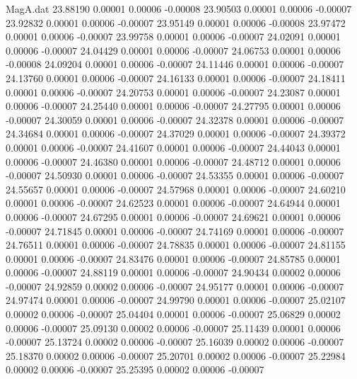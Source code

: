 \begin{filecontents}{MagA.dat}
  23.88190    0.00001    0.00006   -0.00008
  23.90503    0.00001    0.00006   -0.00007
  23.92832    0.00001    0.00006   -0.00007
  23.95149    0.00001    0.00006   -0.00008
  23.97472    0.00001    0.00006   -0.00007
  23.99758    0.00001    0.00006   -0.00007
  24.02091    0.00001    0.00006   -0.00007
  24.04429    0.00001    0.00006   -0.00007
  24.06753    0.00001    0.00006   -0.00008
  24.09204    0.00001    0.00006   -0.00007
  24.11446    0.00001    0.00006   -0.00007
  24.13760    0.00001    0.00006   -0.00007
  24.16133    0.00001    0.00006   -0.00007
  24.18411    0.00001    0.00006   -0.00007
  24.20753    0.00001    0.00006   -0.00007
  24.23087    0.00001    0.00006   -0.00007
  24.25440    0.00001    0.00006   -0.00007
  24.27795    0.00001    0.00006   -0.00007
  24.30059    0.00001    0.00006   -0.00007
  24.32378    0.00001    0.00006   -0.00007
  24.34684    0.00001    0.00006   -0.00007
  24.37029    0.00001    0.00006   -0.00007
  24.39372    0.00001    0.00006   -0.00007
  24.41607    0.00001    0.00006   -0.00007
  24.44043    0.00001    0.00006   -0.00007
  24.46380    0.00001    0.00006   -0.00007
  24.48712    0.00001    0.00006   -0.00007
  24.50930    0.00001    0.00006   -0.00007
  24.53355    0.00001    0.00006   -0.00007
  24.55657    0.00001    0.00006   -0.00007
  24.57968    0.00001    0.00006   -0.00007
  24.60210    0.00001    0.00006   -0.00007
  24.62523    0.00001    0.00006   -0.00007
  24.64944    0.00001    0.00006   -0.00007
  24.67295    0.00001    0.00006   -0.00007
  24.69621    0.00001    0.00006   -0.00007
  24.71845    0.00001    0.00006   -0.00007
  24.74169    0.00001    0.00006   -0.00007
  24.76511    0.00001    0.00006   -0.00007
  24.78835    0.00001    0.00006   -0.00007
  24.81155    0.00001    0.00006   -0.00007
  24.83476    0.00001    0.00006   -0.00007
  24.85785    0.00001    0.00006   -0.00007
  24.88119    0.00001    0.00006   -0.00007
  24.90434    0.00002    0.00006   -0.00007
  24.92859    0.00002    0.00006   -0.00007
  24.95177    0.00001    0.00006   -0.00007
  24.97474    0.00001    0.00006   -0.00007
  24.99790    0.00001    0.00006   -0.00007
  25.02107    0.00002    0.00006   -0.00007
  25.04404    0.00001    0.00006   -0.00007
  25.06829    0.00002    0.00006   -0.00007
  25.09130    0.00002    0.00006   -0.00007
  25.11439    0.00001    0.00006   -0.00007
  25.13724    0.00002    0.00006   -0.00007
  25.16039    0.00002    0.00006   -0.00007
  25.18370    0.00002    0.00006   -0.00007
  25.20701    0.00002    0.00006   -0.00007
  25.22984    0.00002    0.00006   -0.00007
  25.25395    0.00002    0.00006   -0.00007

\end{filecontents}
